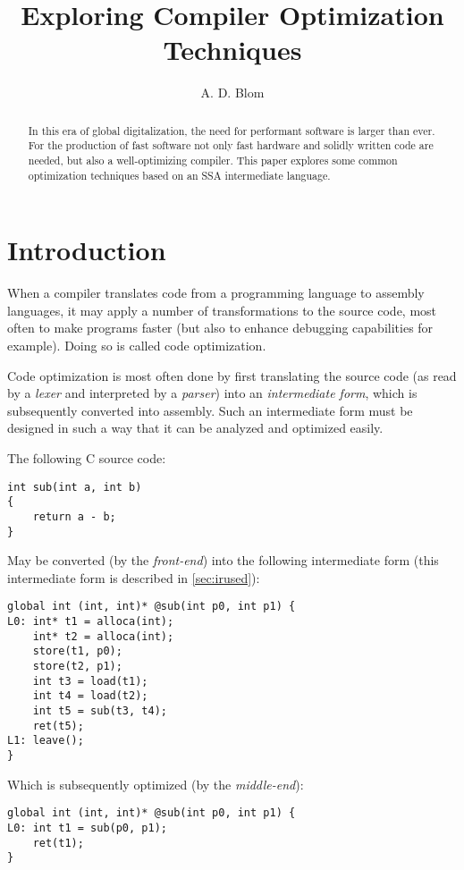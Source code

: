 \documentclass[12pt, a4paper]{article}
\title{Exploring Compiler Optimization Techniques}
\author{A. D. Blom}
\date{}
\begin{document}
 \sloppy
  \maketitle
  \begin{abstract}
In this era of global digitalization, the need for performant software is larger
than ever. For the production of fast software not only 
fast hardware and solidly written code are needed, but also a well-optimizing 
compiler. This paper explores some common optimization techniques based on an 
SSA intermediate language.
  \end{abstract}

  \section{Introduction}
When a compiler translates code from a programming language to assembly languages,
it may apply a number of transformations to the source code, most often to make
programs faster (but also to enhance debugging capabilities for example). Doing
so is called code optimization.

Code optimization is most often done by first translating the source code
(as read by a \textit{lexer} and interpreted by a \textit{parser}) into an
\textit{intermediate form}, which is subsequently converted into assembly. Such
an intermediate form must be designed in such a way that it can be analyzed and
optimized easily.

The following C source code:

\begin{lstlisting}
int sub(int a, int b)
{
	return a - b;
}
\end{lstlisting}

May be converted (by the \textit{front-end}) into the following intermediate form
(this intermediate form is described in \ref{sec:irused}):

\begin{lstlisting}
global int (int, int)* @sub(int p0, int p1) {
L0:	int* t1 = alloca(int);
	int* t2 = alloca(int);
	store(t1, p0);
	store(t2, p1);
	int t3 = load(t1);
	int t4 = load(t2);
	int t5 = sub(t3, t4);
	ret(t5);
L1:	leave();
}
\end{lstlisting}

Which is subsequently optimized (by the \textit{middle-end}):

\begin{lstlisting}
global int (int, int)* @sub(int p0, int p1) {
L0:	int t1 = sub(p0, p1);
	ret(t1);
}
\end{lstlisting}
\end{document}
